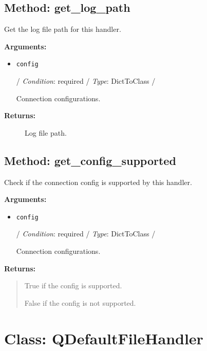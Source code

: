\hypertarget{qconnectbase-qlogger-method-get_log_path-46}{%
\subsection{Method: get\_log\_path}\label{qconnectbase-qlogger-method-get_log_path-46}}

Get the log file path for this handler.

\textbf{Arguments:}

\begin{itemize}
\item
  \texttt{config}

  / \emph{Condition}: required / \emph{Type}: DictToClass /

  Connection configurations.
\end{itemize}

\begin{description}
\item[\textbf{Returns:}]
Log file path.
\end{description}

\hypertarget{qconnectbase-qlogger-method-get_config_supported-47}{%
\subsection{Method:
get\_config\_supported}\label{qconnectbase-qlogger-method-get_config_supported-47}}

Check if the connection config is supported by this handler.

\textbf{Arguments:}

\begin{itemize}
\item
  \texttt{config}

  / \emph{Condition}: required / \emph{Type}: DictToClass /

  Connection configurations.
\end{itemize}

\textbf{Returns:}

\begin{quote}
True if the config is supported.

False if the config is not supported.
\end{quote}

\hypertarget{qconnectbase-qlogger-class-qdefaultfilehandler-48}{%
\section{Class: QDefaultFileHandler}\label{qconnectbase-qlogger-class-qdefaultfilehandler-48}}

